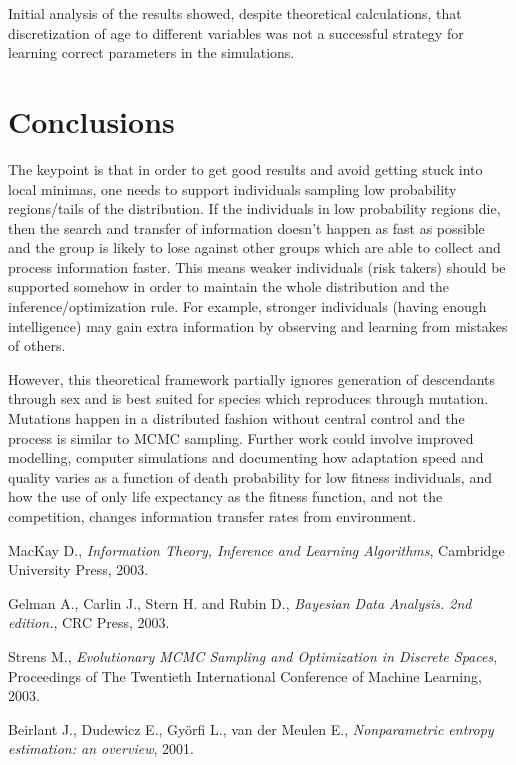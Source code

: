 \documentclass{article}
\begin{document}
Initial analysis of the results showed, despite theoretical calculations, that discretization of age to different variables was not a successful strategy for learning correct parameters in the simulations.



\section{Conclusions} \label{conclusions}

The keypoint is that in order to get good results and avoid getting stuck into local minimas, one needs to support individuals sampling low probability regions/tails of the distribution. If the individuals in low probability regions die, then the search and transfer of information doesn't happen as fast as possible and the group is likely to lose against other groups which are able to collect and process information faster. This means weaker individuals (risk takers) should be supported somehow in order to maintain the whole distribution and the inference/optimization rule. For example, stronger individuals (having enough intelligence) may gain extra information by observing and learning from mistakes of others. 

However, this theoretical framework partially ignores generation of descendants through sex and is best suited for species which reproduces through mutation. Mutations  happen in a distributed fashion without central control and the process is similar to MCMC sampling. Further work could involve improved modelling, computer simulations and documenting how adaptation speed and quality varies as a function of death probability for low fitness individuals, and how the use of only life expectancy as the fitness function, and not the competition, changes information transfer rates from environment.

\begin{thebibliography}{9}

  MacKay D.,
  \emph{Information Theory, Inference and Learning Algorithms},
  Cambridge University Press,
  2003.

  Gelman A., Carlin J., Stern H. and Rubin D.,
  \emph{Bayesian Data Analysis. 2nd edition.},
  CRC Press, 
  2003.

  Strens M.,
  \emph{Evolutionary MCMC Sampling and Optimization in Discrete Spaces},
  Proceedings of The Twentieth International Conference of Machine Learning,
  2003.

  Beirlant J., Dudewicz E., Györfi L., van der Meulen E.,
  \emph{Nonparametric entropy estimation: an overview},
  2001.

\end{thebibliography}
\end{document}
